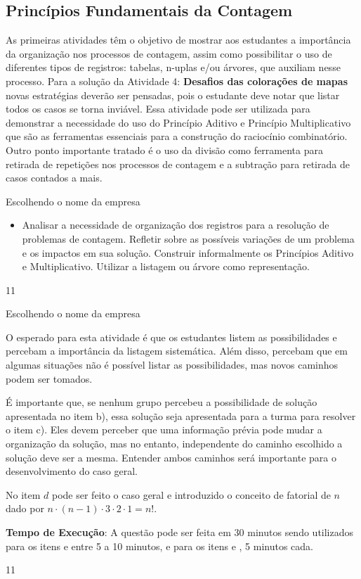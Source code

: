 \begin{texto}
{
  \section{Princípios Fundamentais da Contagem}
  As primeiras atividades têm o objetivo de mostrar aos estudantes a importância da organização nos processos de contagem, assim como possibilitar o uso de diferentes tipos de registros: tabelas, n-uplas e/ou árvores, que auxiliam nesse processo.  Para a solução da Atividade 4: \textbf{Desafios das colorações de mapas}  novas estratégias deverão ser pensadas, pois  o estudante deve notar que listar todos os casos se torna inviável.  Essa atividade pode ser utilizada para demonstrar a necessidade do uso do Princípio Aditivo e Princípio Multiplicativo que são as ferramentas essenciais para a construção do raciocínio combinatório.  Outro ponto importante tratado é o uso da divisão como ferramenta para retirada de repetições nos processos de contagem e a subtração para retirada de casos contados a mais.
}
\end{texto}
\begin{objectives}{Escolhendo o nome da empresa}
{
\begin{itemize}
\item Analisar a necessidade de organização dos registros para a resolução de problemas de contagem. Refletir sobre as possíveis variações de um problema e os impactos em sua solução. Construir informalmente os Princípios Aditivo e Multiplicativo. Utilizar a listagem ou árvore como representação.
\end{itemize}
}{1}{1}
\end{objectives}
\begin{sugestions}{Escolhendo o nome da empresa}
{
O esperado para esta atividade é que os estudantes listem as possibilidades e percebam a importância da listagem sistemática. Além disso, percebam que em algumas situações não é possível listar as possibilidades, mas novos caminhos podem ser tomados.

É importante que, se nenhum grupo percebeu a possibilidade de solução apresentada no item b), essa solução seja apresentada para a turma para resolver o item c). Eles devem perceber que uma informação prévia pode mudar a organização da solução, mas no entanto, independente do caminho escolhido a solução deve ser a mesma. Entender ambos caminhos será importante para o desenvolvimento do caso geral.

No item $d$ pode ser feito o caso geral  e introduzido o conceito de fatorial de $n$ dado por $n \cdot (n-1) \cdot 3 \cdot 2 \cdot 1= n!$.

\textbf{Tempo de Execução}: A questão pode ser feita em 30 minutos sendo utilizados para os itens  e  entre 5 a 10 minutos, e para os itens  e , 5 minutos cada.  
}{1}{1}
\end{sugestions}
